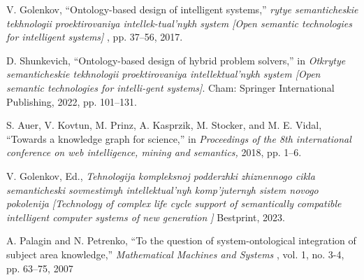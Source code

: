 \documentclass[10pt, a4paper]{article}
\begin{document}
\begin{multicols}{2}
\noindent[6] V. Golenkov, “Ontology-based design of intelligent systems,” \textit{rytye semanticheskie tekhnologii proektirovaniya intellek-tual’nykh system [Open semantic technologies for intelligent
systems]} , pp. 37–56, 2017.

\noindent [7] D. Shunkevich, “Ontology-based design of hybrid problem
solvers,” in \textit{ Otkrytye semanticheskie tekhnologii proektirovaniya intellektual’nykh system [Open semantic technologies for intelli-gent systems]}. Cham: Springer International Publishing, 2022, pp. 101–131.

 \noindent [8] S. Auer, V. Kovtun, M. Prinz, A. Kasprzik, M. Stocker, and M. E. Vidal, “Towards a knowledge graph for science,” in \textit{ Proceedings of the 8th international conference on web intelligence, mining and semantics,} 2018, pp. 1–6.

 \noindent [9] V. Golenkov, Ed., \textit{Tehnologija kompleksnoj podderzhki zhiznennogo cikla semanticheski sovmestimyh intellektual’nyh komp’juternyh sistem novogo pokolenija [Technology of complex life cycle support of semantically compatible intelligent computer systems of new generation ]} \qquad Bestprint, 2023.

 \noindent [10] A. Palagin and N. Petrenko, “To the question of system-ontological integration of subject area knowledge,” \textit{ Mathematical Machines and Systems} , vol. 1, no. 3-4, pp. 63–75, 2007
\end{multicols}
\end{document}

